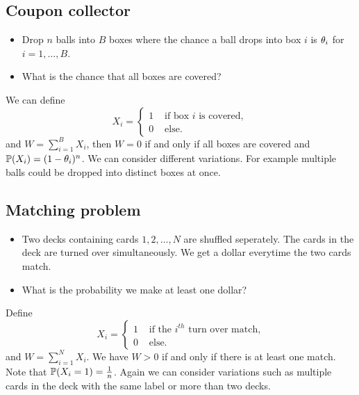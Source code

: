 \subsection{Coupon collector}
\begin{itemize}
    \item Drop $n$ balls into $B$ boxes where the chance a ball drops into box $i$ is ${\theta}_i$ for $i =1,\ldots, B$.
    \item What is the chance that all boxes are covered?
\end{itemize}
We can define 
\[X_i = \begin{cases}
    1 & \text{ if box $i$ is covered},\\
    0 & \text{ else}.
\end{cases} \]
and $W = \sum_{i=1}^B X_i$, then $W=0$ if and only if all boxes are covered and ${\mathbb{P}}(X_i) = (1-{\theta}_i)^n$. We can consider different variations. For example multiple balls could be dropped into distinct boxes at once.
\subsection{Matching problem}
\begin{itemize}
    \item Two decks containing cards $1,2,\ldots,N$ are shuffled seperately. The cards in the deck are turned over simultaneously. We get a dollar everytime the two cards match.
    \item What is the probability we make at least one dollar?
\end{itemize}
Define 
\[X_i = \begin{cases}
    1 & \text{ if the $i^{th}$ turn over match,}\\
    0 &  \text{ else.}
\end{cases} \]
and $W = \sum_{i=1}^N X_i$. We have $W > 0$ if and only if there is at least one match. Note that ${\mathbb{P}}(X_i=1)= \frac{1}{n}$. Again we can consider variations such as multiple cards in the deck with the same label or more than two decks.
